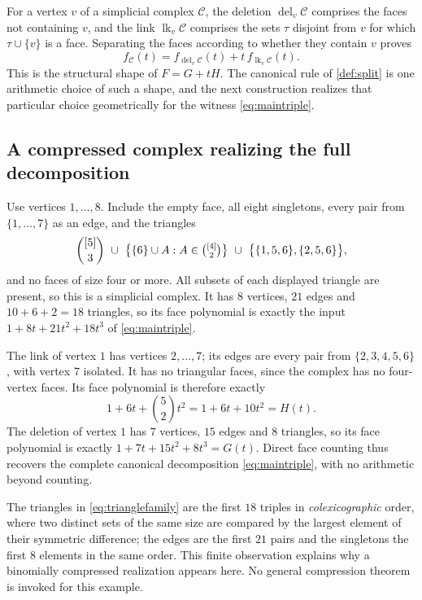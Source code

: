 \documentclass[11pt,letterpaper]{article}
\numberwithin{equation}{section}
\theoremstyle{definition}
\theoremstyle{remark}
\DeclareMathOperator{\lk}{lk}
\DeclareMathOperator{\del}{del}
\begin{document}
For a vertex $v$ of a simplicial complex $\mathcal C$, the deletion
$\del_v\mathcal C$ comprises the faces not containing $v$, and the link
$\lk_v\mathcal C$ comprises the sets $\tau$ disjoint from $v$ for which
$\tau\cup\{v\}$ is a face. Separating the faces according to whether they
contain $v$ proves
\begin{equation}\label{eq:deletelink}
 f_{\mathcal C}(t)=f_{\del_v\mathcal C}(t)+t\,f_{\lk_v\mathcal C}(t).
\end{equation}
This is the structural shape of $F=G+tH$. The canonical rule of
\cref{def:split} is one arithmetic choice of such a shape, and the next
construction realizes that particular choice geometrically for the witness
\eqref{eq:maintriple}.

\subsection{A compressed complex realizing the full decomposition}

Use vertices $1,\ldots,8$. Include the empty face, all eight singletons, every
pair from $\{1,\ldots,7\}$ as an edge, and the triangles
\begin{equation}\label{eq:trianglefamily}
 \binom{[5]}{3}
 \ \cup\ \bigl\{\{6\}\cup A:A\in\tbinom{[4]}2\bigr\}
 \ \cup\ \bigl\{\{1,5,6\},\{2,5,6\}\bigr\},
\end{equation}
and no faces of size four or more. All subsets of each displayed triangle are
present, so this is a simplicial complex. It has $8$ vertices, $21$ edges and
$10+6+2=18$ triangles, so its face polynomial is exactly the input
$1+8t+21t^2+18t^3$ of \eqref{eq:maintriple}.

The link of vertex $1$ has vertices $2,\ldots,7$; its edges are every pair from
$\{2,3,4,5,6\}$, with vertex $7$ isolated. It has no triangular faces, since
the complex has no four-vertex faces. Its face polynomial is therefore exactly
\[
 1+6t+\binom52t^2=1+6t+10t^2=H(t).
\]
The deletion of vertex $1$ has $7$ vertices, $15$ edges and $8$ triangles, so
its face polynomial is exactly $1+7t+15t^2+8t^3=G(t)$. Direct face counting
thus recovers the complete canonical decomposition \eqref{eq:maintriple}, with
no arithmetic beyond counting.

The triangles in \eqref{eq:trianglefamily} are the first $18$ triples in
\emph{colexicographic} order, where two distinct sets of the same size are
compared by the largest element of their symmetric difference; the edges are
the first $21$ pairs and the singletons the first $8$ elements in the same
order. This finite observation explains why a binomially compressed
realization appears here. No general compression theorem is invoked for this
example.
\end{document}
